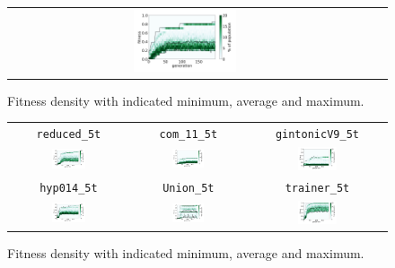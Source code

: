 \documentclass[11pt,a4paper]{scrartcl}
\begin{document}
\begin{figure}[H]
\begin{tabular}{ccc}
\includegraphics[width=0.3\textwidth]{img/standard_trainer.png}
\end{tabular}
\caption{Fitness density with indicated minimum, average and maximum.}
\label{fig:standard}
\end{figure}


\begin{figure}[H]
\center
\begin{tabular}{ccc}
\texttt{reduced\_5t} & \texttt{com\_11\_5t} & \texttt{gintonicV9\_5t} \\
\includegraphics[width=0.3\textwidth]{img/standard_reduced_5t.png} &
\includegraphics[width=0.3\textwidth]{img/standard_com_11_5t.png} &
\includegraphics[width=0.3\textwidth]{img/standard_gintonicV9_5t.png} \\
\texttt{hyp014\_5t} & \texttt{Union\_5t} & \texttt{trainer\_5t} \\
\includegraphics[width=0.3\textwidth]{img/standard_hyp014_5t.png} &
\includegraphics[width=0.3\textwidth]{img/standard_Union_5t.png} &
\includegraphics[width=0.3\textwidth]{img/standard_trainer_5t.png}
\end{tabular}
\caption{Fitness density with indicated minimum, average and maximum.}
\label{fig:standard_5t}
\end{figure}


{}

\end{document}
